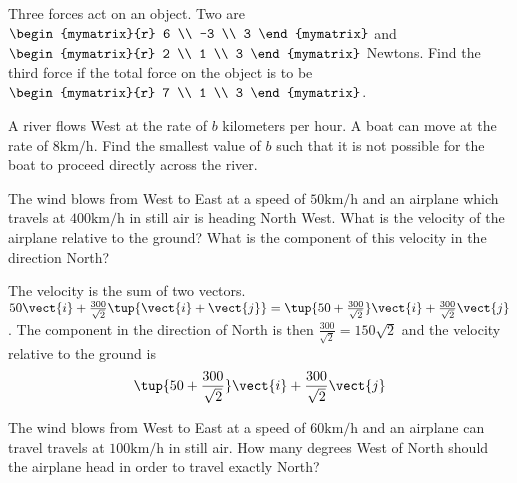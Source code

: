 \begin{enumialphparenastyle}
\begin{ex} Three forces act on an object. Two are $\begin{mymatrix}{r}
6 \\
-3 \\
3
\end{mymatrix} $ and $\begin{mymatrix}{r}
2 \\
1 \\
3
\end{mymatrix} $ Newtons. Find the third force if the total force on the object is
to be $\begin{mymatrix}{r}
7 \\
1 \\
3
\end{mymatrix}$. \vspace{1mm}
\end{ex}

\begin{ex} A river flows West at the rate of $b$ kilometers per hour. A boat can move
at the rate of $8\textrm{km}/\textrm{h}$. Find the smallest value of $b$ such that
it is not possible for the boat to proceed directly across the river.
\vspace{1mm}
\end{ex}

\begin{ex} The wind blows from West to East at a speed of $50\textrm{km}/\textrm{h}$ and
an airplane which travels at $400\textrm{km}/\textrm{h}$ in still air is heading
North West. What is the velocity of the airplane relative to the ground?
What is the component of this velocity in the direction North? \vspace{1mm}
\begin{sol}
The velocity is the sum of two vectors. $50\vect{i}+\frac{
300}{\sqrt{2}} \tup{\vect{i}+\vect{j}} =\tup{50+\frac{300}{\sqrt{2}}
} \vect{i}+ \frac{300}{\sqrt{2}}\vect{j}$. The component in the
direction of North is then $\frac{300}{\sqrt{2}}= 150\sqrt{2}$
and the velocity relative to the ground is
\[
\tup{50+\frac{300}{\sqrt{2}}} \vect{i}+\frac{300}{\sqrt{2}}\vect{j}
\]
\end{sol}
\end{ex}

\begin{ex} The wind blows from West to East at a speed of $60\textrm{km}/\textrm{h}$ and
an airplane can travel travels at $100\textrm{km}/\textrm{h}$ in still air. How
many degrees West of North should the airplane head in order to travel
exactly North? \vspace{1mm}
\end{ex}



\end{enumialphparenastyle}
